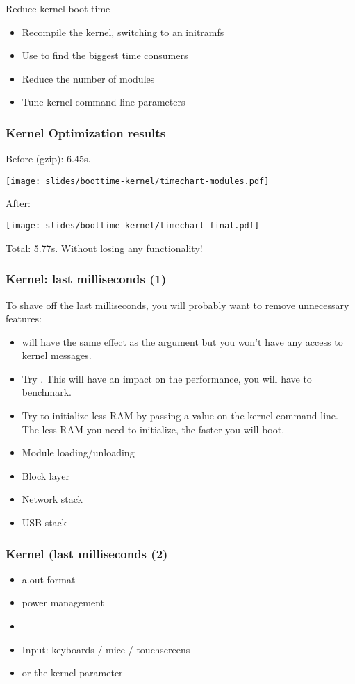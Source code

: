 \setuplabframe
{Reduce kernel boot time}
{
\begin{itemize}
\item Recompile the kernel, switching to an initramfs
\item Use  to find the biggest
      time consumers
\item Reduce the number of modules
\item Tune kernel command line parameters
\end{itemize}
}

\begin{frame}
\frametitle{Kernel Optimization results}
Before (gzip): 6.45s.
\begin{center}
    \texttt{[image: slides/boottime-kernel/timechart-modules.pdf]}
\end{center}
After:
\begin{center}
    \texttt{[image: slides/boottime-kernel/timechart-final.pdf]}
\end{center}
Total: 5.77s. Without losing any functionality!
\end{frame}

\begin{frame}
\frametitle{Kernel: last milliseconds (1)}
To shave off the last milliseconds, you will probably want to remove
unnecessary features:
\begin{itemize}
        \item {} will have the same effect as the
                argument but you won't have any access to kernel
messages.
        \item Try . This will have
an
                impact on the performance, you will have to benchmark.
        \item Try to initialize less RAM by passing a  value
on the
                kernel command line. The less RAM you need to
initialize, the
                faster you will boot.
        \item Module loading/unloading
        \item Block layer
        \item Network stack
        \item USB stack
\end{itemize}
\end{frame}

\begin{frame}
\frametitle{Kernel (last milliseconds (2)}
\begin{itemize}
        \item a.out format
        \item power management
        \item {}
        \item Input: keyboards / mice / touchscreens
        \item {} or the
                 kernel parameter
\end{itemize}
\end{frame}

